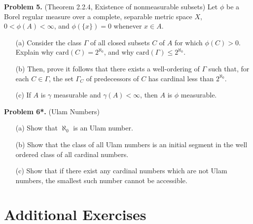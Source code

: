 \documentclass[10pt]{article}
\begin{document}
	\noindent \textbf{Problem 5.} (Theorem 2.2.4, Existence of nonmeasurable subsets) Let $\phi$ be a Borel regular measure over a complete, separable metric space $X$, $0 < \phi(A) < \infty$, and $\phi(\{x\}) = 0$ whenever $x \in A$.  
		\begin{itemize}
			\item[(a)] Consider the class $\mathit \Gamma$ of all closed subsets $C$ of $A$ for which $\phi(C) > 0$. Explain why $\text{card}(C) = 2^{\aleph_0}$, and why $\text{card}(\mathit \Gamma) \leq 2^{\aleph_0}$. 
			
			\item[(b)] Then, prove it follows that there exists a well-ordering of $\mathit \Gamma$ such that, for each $C \in \Gamma$, the set $\mathit \Gamma_C$ of predecessors of $C$ has cardinal less than $2^{\aleph_0}$.
			
			\item[(c)] If $A $ is $\gamma$ measurable and $\gamma(A) < \infty$, then $A$ is $\phi$ measurable.
		\end{itemize}
	
	\vspace{20pt}
	
	\noindent \textbf{Problem 6*.} (Ulam Numbers) ~
		\begin{itemize}
			\item[(a)]  Show that $\aleph_0$ is an Ulam number.
			
			\item[(b)] Show that the class of all Ulam numbers is an initial segment in the well ordered class of all cardinal numbers.
			
			\item[(c)] Show that if there exist any cardinal numbers which are not Ulam numbers, the smallest such number cannot be accessible. 
		\end{itemize}
	
	\newpage 
	\section*{Additional Exercises}
	
	\vspace{10pt}
	
\end{document}
